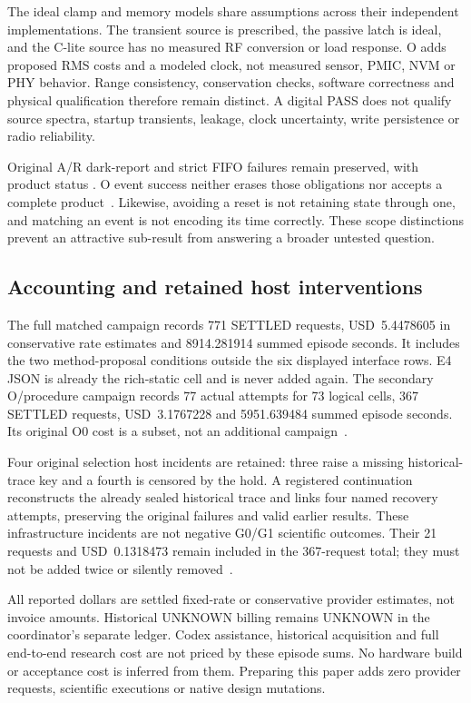 The ideal clamp and memory models share assumptions across their
independent implementations. The transient source is prescribed,
the passive latch is ideal, and the C-lite source has no measured
RF conversion or load response. O adds proposed RMS costs and a
modeled clock, not measured sensor, PMIC, NVM or PHY behavior.
Range consistency, conservation checks, software correctness and
physical qualification therefore remain distinct. A digital PASS
does not qualify source spectra, startup transients, leakage,
clock uncertainty, write persistence or radio reliability.

Original A/R dark-report and strict FIFO failures remain preserved,
with product status . O event success neither
erases those obligations nor accepts a complete product~\cite{ar}.
Likewise, avoiding a reset is not retaining state through one, and
matching an event is not encoding its time correctly. These scope
distinctions prevent an attractive sub-result from answering a
broader untested question.

\subsection{Accounting and retained host interventions}
The full matched campaign records 771 SETTLED requests,
USD~5.4478605 in conservative rate estimates and 8914.281914 summed
episode seconds. It includes the two method-proposal conditions
outside the six displayed interface rows. E4 JSON is already the
rich-static cell and is never added again. The secondary O/procedure
campaign records 77 actual attempts for 73 logical cells, 367
SETTLED requests, USD~3.1767228 and 5951.639484 summed episode
seconds. Its original O0 cost is a subset, not an additional
campaign~\cite{comparison,transfer,preservation}.

Four original selection host incidents are retained: three raise
a missing historical-trace key and a fourth is censored by the
hold. A registered continuation reconstructs the already sealed
historical trace and links four named recovery attempts, preserving
the original failures and valid earlier results. These infrastructure
incidents are not negative G0/G1 scientific outcomes. Their 21
requests and USD~0.1318473 remain included in the 367-request
total; they must not be added twice or silently removed~\cite{repair}.

All reported dollars are settled fixed-rate or conservative provider
estimates, not invoice amounts. Historical UNKNOWN billing remains
UNKNOWN in the coordinator's separate ledger. Codex assistance,
historical acquisition and full end-to-end research cost are not
priced by these episode sums. No hardware build or acceptance cost
is inferred from them. Preparing this paper adds zero provider
requests, scientific executions or native design mutations.

